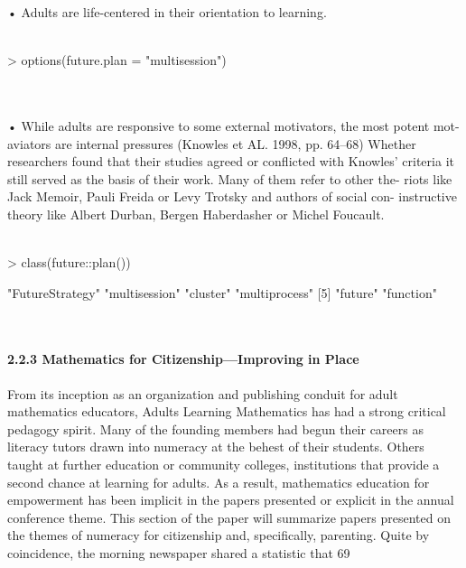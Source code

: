 \documentclass{article}
\begin{document}
 • Adults are life-centered in their orientation to learning.
\textit{\\\\}
\begin{Schunk}
\begin{Sinput}
> options(future.plan = "multisession")
\end{Sinput}
\end{Schunk}
\textit{\\\\}
 • While adults are responsive to some external motivators, the most potent mot-
   aviators are internal pressures (Knowles et AL. 1998, pp. 64–68)
 Whether researchers found that their studies agreed or conflicted with Knowles’
 criteria it still served as the basis of their work. Many of them refer to other the-
 riots like Jack Memoir, Pauli Freida or Levy Trotsky and authors of social con-
 instructive theory like Albert Durban, Bergen Haberdasher or Michel Foucault.
\textit{\\\\}
\begin{Schunk}
\begin{Sinput}
> class(future::plan())
\end{Sinput}
\begin{Soutput}
[1] "FutureStrategy" "multisession"   "cluster"        "multiprocess"  
[5] "future"         "function"      
\end{Soutput}
\end{Schunk}
\textit{\\\\}
\textbf{2.2.3 Mathematics for Citizenship—Improving in Place}
\textit{\\\\}
 From its inception as an organization and publishing conduit for adult mathematics
 educators, Adults Learning Mathematics has had a strong critical pedagogy spirit.
 Many of the founding members had begun their careers as literacy tutors drawn
 into numeracy at the behest of their students. Others taught at further education
 or community colleges, institutions that provide a second chance at learning for
 adults. As a result, mathematics education for empowerment has been implicit in
 the papers presented or explicit in the annual conference theme. This section of the
 paper will summarize papers presented on the themes of numeracy for citizenship
 and, specifically, parenting. Quite by coincidence, the morning newspaper shared
 a statistic that 69 %
\end{document}
